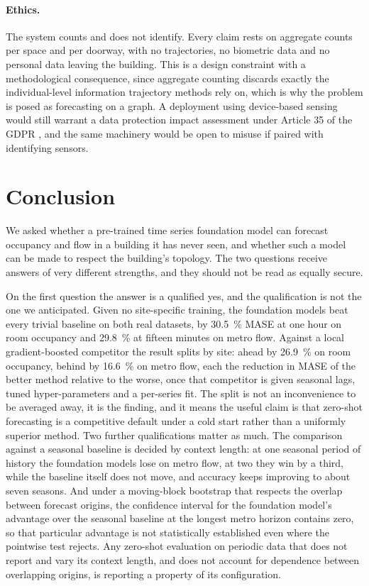 \documentclass[utf8]{FrontiersinHarvard}
\newif\ifrevisionmarkup
\newcommand{\new}[1]{\ifrevisionmarkup\textcolor{revision}{#1}\else#1\fi}
\newif\ifsecondrevisionmarkup
\newcommand{\rev}[1]{\ifsecondrevisionmarkup\textcolor{revisiontwo}{#1}\else#1\fi}
\theoremstyle{plain}
\theoremstyle{definition}
\theoremstyle{remark}
\begin{document}
\paragraph{Ethics.}
The system counts and does not identify. Every claim rests on aggregate counts per space and per doorway, with no trajectories, no biometric data and no personal data leaving the building. This is a design constraint with a methodological consequence, since aggregate counting discards exactly the individual-level information trajectory methods rely on, which is why the problem is posed as forecasting on a graph. A deployment using device-based sensing would still warrant a data protection impact assessment under Article 35 of the GDPR \citep{gdpr}, and the same machinery would be open to misuse if paired with identifying sensors.

\section{Conclusion}

We asked whether a pre-trained time series foundation model can forecast occupancy and flow in a building it has never seen, and whether such a model can be made to respect the building's topology. \new{The two questions receive answers of very different strengths\rev{, and they should not be read as equally secure}.}

\new{On the first question the answer is a qualified yes, and the qualification is not the one we anticipated. Given no site-specific training, the foundation models beat every trivial baseline on both real datasets, by \SI{30.5}{\percent} MASE at one hour on room occupancy and \SI{29.8}{\percent} at fifteen minutes on metro flow. Against a local gradient-boosted competitor the result splits by site: ahead by \rev{\SI{26.9}{\percent}} on room occupancy, behind by \rev{\SI{16.6}{\percent}} on metro flow\rev{, each the reduction in MASE of the better method relative to the worse,} once that competitor is given seasonal lags, tuned hyper-parameters and a per-series fit. The split is not an inconvenience to be averaged away, it is the finding, and it means the useful claim is that zero-shot forecasting is a competitive default under a cold start rather than a uniformly superior method. Two further qualifications matter as much. The comparison against a seasonal baseline is decided by context length: at one seasonal period of history the foundation models lose on metro flow, at two they win by a third, while the baseline itself does not move, and accuracy keeps improving to about seven seasons. And under a moving-block bootstrap that respects the overlap between forecast origins, the confidence interval for the foundation model's advantage over the seasonal baseline at the longest metro horizon contains zero, so that particular advantage is not statistically established even where the pointwise test rejects. Any zero-shot evaluation on periodic data that does not report and vary its context length, and does not account for dependence between overlapping origins, is reporting a property of its configuration.}
\end{document}
